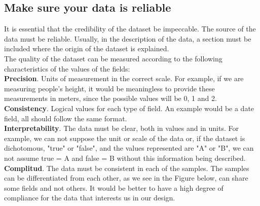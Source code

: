 \subsection{Make sure your data is reliable}

It is essential that the credibility of the dataset be impeccable. The source of the data must be reliable.
Usually, in the description of the data, a section must be included where the origin of the dataset is explained.\\

The quality of the dataset can be measured according to the following characteristics of the values of the fields: \\
 
\textbf{Precision}. Units of measurement in the correct scale. For example, if we are measuring people's height, it 
would be meaningless to provide these measurements in meters, since the possible values will be 0, 1 and 2. \\

\textbf{Consistency}. Logical values for each type of field. An example would be a date field, all should
follow the same format. \\

\textbf{Interpretability}. The data must be clear, both in values and in units. For example, we can not
suppose the unit or scale of the data or, if the dataset is dichotomous, "true" or "false", and the values represented are
"A" or "B", we can not assume true = A and false = B without this information being described. \\

\textbf{Complitud}. The data must be consistent in each of the samples. The samples can be differentiated
from each other, as we see in the Figure below, can share some fields and not others. It would be
better to have a high degree of compliance for the data that interests us in our design.

